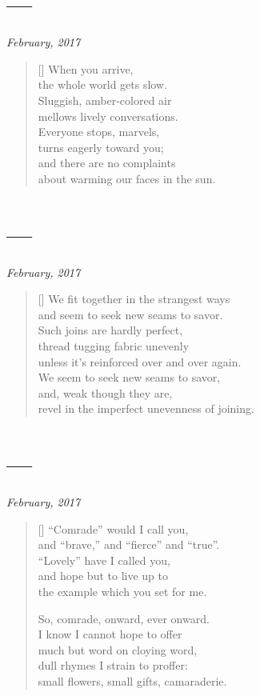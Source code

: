 \section{---}

\hfill\textit{February, 2017}

\begin{verse}[\textwidth]
  When you arrive,\\
  the whole world gets slow.\\
  Sluggish, amber-colored air\\
  mellows lively conversations.\\
  Everyone stops, marvels,\\
  turns eagerly toward you;\\
  and there are no complaints\\
  about warming our faces in the sun.
\end{verse}
\newpage

\section{---}

\hfill\textit{February, 2017}

\begin{verse}[\textwidth]
  We fit together in the strangest ways\\
  and seem to seek new seams to savor.\\
  Such joins are hardly perfect,\\
  thread tugging fabric unevenly\\
  unless it's reinforced over and over again.\\
  We seem to seek new seams to savor,\\
  and, weak though they are,\\
  revel in the imperfect unevenness of joining.
\end{verse}
\newpage

\section{---}

\hfill\textit{February, 2017}

\begin{verse}[\textwidth]
  ``Comrade'' would I call you,\\
  and ``brave,'' and ``fierce'' and ``true''.\\
  ``Lovely'' have I called you,\\
  and hope but to live up to\\
  the example which you set for me.

  So, comrade, onward, ever onward.\\
  I know I cannot hope to offer\\
  much but word on cloying word,\\
  dull rhymes I strain to proffer:\\
  small flowers, small gifts, camaraderie.
\end{verse}
\newpage

